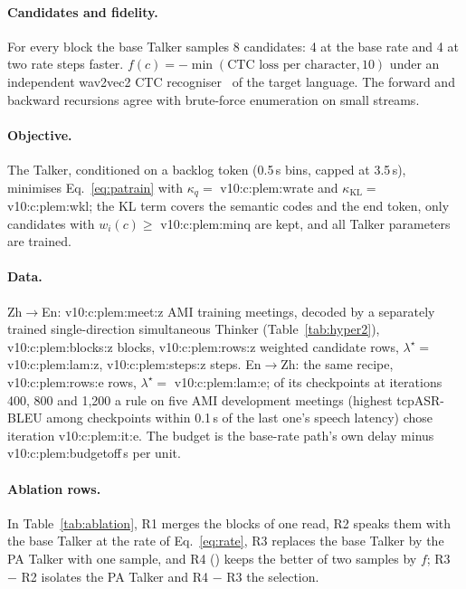 \paragraph{Candidates and fidelity.} For every block the base Talker samples 8 candidates: 4 at the base rate and 4
at two rate steps faster. $f(c)=-\min(\text{CTC loss per character},10)$ under an independent wav2vec2 CTC
recogniser~\citep{baevski2020wav2vec} of the target language. The forward and backward recursions agree with
brute-force enumeration on small streams.

\paragraph{Objective.} The Talker, conditioned on a backlog token (0.5\,s bins, capped at 3.5\,s), minimises
Eq.~\eqref{eq:patrain} with $\kappa_q=$ \num{v10:c:plem:wrate} and $\kappa_{\mathrm{KL}}=$ \num{v10:c:plem:wkl}; the KL
term covers the semantic codes and the end token, only candidates with $w_i(c)\ge$ \num{v10:c:plem:minq} are kept, and
all Talker parameters are trained.

\paragraph{Data.} Zh$\rightarrow$En: \num{v10:c:plem:meet:z} AMI training meetings, decoded by a separately trained
single-direction simultaneous Thinker (Table~\ref{tab:hyper2}), \num{v10:c:plem:blocks:z} blocks,
\num{v10:c:plem:rows:z} weighted candidate rows, $\lambda^\star=$ \num{v10:c:plem:lam:z}, \num{v10:c:plem:steps:z}
steps. En$\rightarrow$Zh: the same recipe, \num{v10:c:plem:rows:e} rows, $\lambda^\star=$ \num{v10:c:plem:lam:e}; of its
checkpoints at iterations 400, 800 and 1{,}200 a rule on five AMI development meetings (highest tcpASR-BLEU among
checkpoints within 0.1\,s of the last one's speech latency) chose iteration \num{v10:c:plem:it:e}. The budget is the
base-rate path's own delay minus \num{v10:c:plem:budgetoff}\,s per unit.

\paragraph{Ablation rows.} In Table~\ref{tab:ablation}, R1 merges the blocks of one read, R2 speaks them with the base
Talker at the rate of Eq.~\eqref{eq:rate}, R3 replaces the base Talker by the PA Talker with one sample, and R4
(\sys{}) keeps the better of two samples by $f$; R3 $-$ R2 isolates the PA Talker and R4 $-$ R3 the selection.

